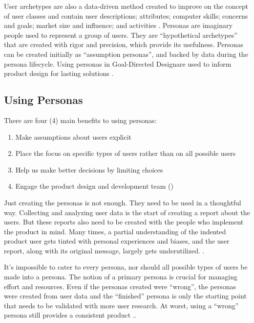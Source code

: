 \documentclass[010-intro.tex]{subfiles}
\begin{document}
    User archetypes are also a data-driven method created to improve on the concept of user classes and contain user
    descriptions; attributes; computer skills; concerns and goals; market size and influence; and activities
    \cite{mikkelsonIncorporatingUserArchetypes2000}.
    Personas are imaginary people used to represent a group of users.
    They are ``hypothetical archetypes'' that are created with rigor and precision, which provide its usefulness.
    Personas can be created initially as ``assumption personas'', and backed by data during the persona lifecycle.
    Using personas in Goal-Directed Design\texttrademark are used to inform product design for lasting solutions
    \cite{cooperInmatesAreRunning1999, pruittPersonaLifecycleKeeping2006}.

\subsection{Using Personas}

    There are four (4) main benefits to using personas:

    \begin{enumerate}
        \item Make assumptions about users explicit
        \item Place the focus on specific types of users rather than on all possible users
        \item Help us make better decisions by limiting choices
        \item Engage the product design and development team
            (\citet{pruittPersonaLifecycleKeeping2006, schwartzParadoxChoiceWhy2016})
    \end{enumerate}

    Just creating the personas is not enough.
    They need to be used in a thoughtful way.
    Collecting and analyzing user data is the start of creating a report about the users.
    But these reports also need to be created with the people who implement the product in mind.
    Many times, a partial understanding of the indented product user gets
    tinted with personal experiences and biases,
    and the user report, along with its original message, largely gets underutilized.
    \cite{pruittPersonaLifecycleKeeping2006}.

    It's impossible to cater to every persona,
    nor should all possible types of users be made into a persona.
    The notion of a primary persona is crucial for managing effort and resources.
    Even if the personas created were ``wrong'',
    the personas were created from user data and the ``finished'' persona is only the starting point
    that needs to be validated with more user research.
    At worst, using a ``wrong'' persona still provides a consistent product
    \cite{pruittPersonaLifecycleKeeping2006}..
\end{document}
